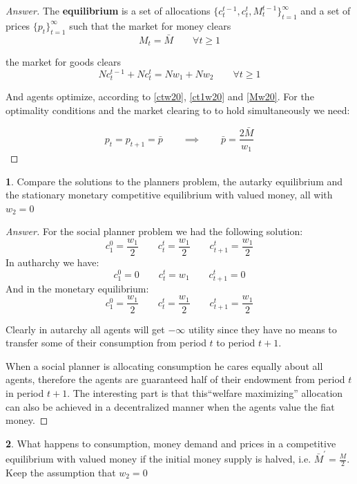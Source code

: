 \documentclass{article}
\theoremstyle{definition}
\newtheorem{subproblem}{}[problem]
\newcommand{\qiq}{\qquad \implies \qquad}
\begin{document}
\begin{proof}[Answer]
The \textbf{equilibrium} is a set of allocations $\{c_t^{t-1}, c_t^t, M_t^{t-1}\}_{t=1}^\infty$ and a set of prices $\{p_t\}_{t=1}^\infty$ such that the market for money clears
\begin{equation}
M_t = \bar{M} \qquad \forall t \geq 1
\end{equation}

the market for goods clears
\begin{equation}
Nc_t^{t-1} + Nc_t^t  = N w_1 + N w_2 \qquad \forall t \geq 1
\end{equation}

And agents optimize, according to \eqref{ctw20}, \eqref{ct1w20} and \eqref{Mw20}. For the optimality conditions and the market clearing to to hold simultaneously we need:

$$p_t = p_{t+1} =\bar{p} \qiq \bar{p}= \frac{2 \bar{M}}{w_1}$$

\end{proof}
\newpage
\begin{subproblem}
Compare the solutions to the planners problem, the autarky equilibrium and the stationary monetary competitive equilibrium with valued money, all with $w_2 = 0$
\end{subproblem}

\begin{proof}[Answer]

For the social planner problem we had the following solution:
$$c_{1}^{0}= \frac{w_1}{2} \qquad c_{t}^{t} = \frac{w_1}{2}  \qquad c_{t+1}^{t}= \frac{w_1}{2}$$
In autharchy we have:
$$c_{1}^{0}=0  \qquad c_{t}^{t} =w_1   \qquad c_{t+1}^{t}= 0$$
And in the monetary equilibrium:
$$c_{1}^{0}= \frac{w_1}{2} \qquad c_{t}^{t} = \frac{w_1}{2}  \qquad c_{t+1}^{t}= \frac{w_1}{2}$$

Clearly in autarchy all agents will get $-\infty$ utility since they have no means to transfer some of their consumption from period $t$ to period $t+1$.

When a social planner is allocating consumption he cares equally about all agents, therefore the agents are guaranteed half of their endowment from period $t$ in period $t+1$. The interesting part is that this``welfare maximizing'' allocation can also be achieved in a decentralized manner when the agents value the fiat money.

\end{proof}

\begin{subproblem}
What happens to consumption, money demand and prices in a competitive equilibrium
with valued money if the initial money supply is halved, i.e. $\bar{M}^{\prime}=\frac{M}{2}$. Keep the
assumption that $w_{2}=0$
\end{subproblem}
\end{document}
